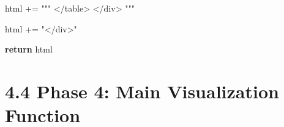 \documentclass[
  11pt,
  letterpaper,
]{book}
\newenvironment{Shaded}{\begin{snugshade}}{\end{snugshade}}
\newcommand{\ControlFlowTok}[1]{\textcolor[rgb]{0.00,0.23,0.31}{\textbf{#1}}}
\newcommand{\NormalTok}[1]{\textcolor[rgb]{0.00,0.23,0.31}{#1}}
\newcommand{\OperatorTok}[1]{\textcolor[rgb]{0.37,0.37,0.37}{#1}}
\newcommand{\StringTok}[1]{\textcolor[rgb]{0.13,0.47,0.30}{#1}}
\begin{document}
\begin{Shaded}
\begin{Highlighting}[]
\NormalTok{        html }\OperatorTok{+=} \StringTok{"""}
\StringTok{            \textless{}/table\textgreater{}}
\StringTok{        \textless{}/div\textgreater{}}
\StringTok{        """}

\NormalTok{    html }\OperatorTok{+=} \StringTok{"\textless{}/div\textgreater{}"}

    \ControlFlowTok{return}\NormalTok{ html}
\end{Highlighting}
\end{Shaded}

\section{4.4 Phase 4: Main Visualization
Function}\label{phase-4-main-visualization-function}

\label{main_visualization_function}
\end{document}
